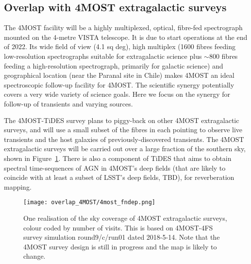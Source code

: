 \subsection{Overlap with 4MOST extragalactic surveys}


The 4MOST facility will be a highly multiplexed, optical, fibre-fed
spectrograph mounted on the 4-metre VISTA telescope. It is due to
start operations at the end of 2022. Its wide field of view (4.1 sq
deg), high multiplex (1600 fibres feeding low-resolution spectrographs
suitable for extragalactic science plus $\sim 800$ fibres feeding a
high-resolution spectrograph, primarily for galactic science) and
geographical location (near the Paranal site in Chile) makes 4MOST an
ideal spectroscopic follow-up facility for 4MOST. The scientific
synergy potentially covers a very wide variety of science goals. Here
we focus on the synergy for follow-up of transients and varying
sources.

The 4MOST-TiDES survey plans to piggy-back on other 4MOST
extragalactic surveys, and will use a small subset of the fibres in
each pointing to observe live transients and the host galaxies of
previously-discovered transients. The 4MOST extragalactic surveys will
be carried out over a large fraction of the southern sky, shown in
Figure~\ref{4most_sky}.  There is also a component of TiDES that aims
to obtain spectral time-sequences of AGN in 4MOST's deep fields (that
are likely to coincide with at least a subset of LSST's deep fields,
TBD), for reverberation mapping.

\begin{figure}[!htbp]
\begin{center}
  \texttt{[image: overlap\_4MOST/4most\_fndep.png]}
\end{center}

\caption{One realisation of the sky coverage of 4MOST extragalactic
  surveys, colour coded by number of visits. This is based on
  4MOST-4FS survey simulation round9/c/run01 dated 2018-5-14. Note
  that the 4MOST survey design is still in progress and the map is
  likely to change.}
\label{4most_sky}
\end{figure}

